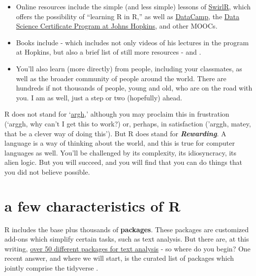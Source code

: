 \documentclass[
  openany]{book}
\providecommand{\tightlist}{%
  \setlength{\itemsep}{0pt}\setlength{\parskip}{0pt}}
\begin{document}
\begin{itemize}
\tightlist
\item
  Online resources include the simple (and less simple) lessons of \href{http://swirlstats.com/}{SwirlR}, which offers the possibility of ``learning R in R,'' as well as \href{https://www.datacamp.com/home}{DataCamp}, the \href{https://www.coursera.org/specializations/jhu-data-science}{Data Science Certificate Program at Johns Hopkins,} and other MOOCs.\\
\item
  Books include \citet{peng2015r} - which includes not only videos of his lectures in the program at Hopkins, but also a brief list of still more resources - and \citet{wickham2016r}.
\item
  You'll also learn (more directly) from people, including your classmates, as well as the broader community of people around the world. There are hundreds if not thousands of people, young and old, who are on the road with you. I am as well, just a step or two (hopefully) ahead.
\end{itemize}

R does not stand for `\href{https://www.urbandictionary.com/define.php?term=ARGH}{argh},' although you may proclaim this in frustration (`arggh, why can't I get this to work?) or, perhaps, in satisfaction ('arggh, matey, that be a clever way of doing this'). But R does stand for \textbf{\emph{Rewarding}}. A language is a way of thinking about the world, and this is true for computer languages as well. You'll be challenged by its complexity, its idiosyncracy, its alien logic. But you will succeed, and you will find that you can do things that you did not believe possible.

\hypertarget{a-few-characteristics-of-r}{%
\section{a few characteristics of R}\label{a-few-characteristics-of-r}}

R includes the base plus thousands of \textbf{packages}. These packages are customized add-ons which simplify certain tasks, such as text analysis. But there are, at this writing, \href{https://cran.r-project.org/web/views/NaturalLanguageProcessing.html}{over 50 different packages for text analysis} - so where do you begin? One recent answer, and where we will start, is the curated list of packages which jointly comprise the tidyverse \citep{wickham2016r}.
\end{document}
